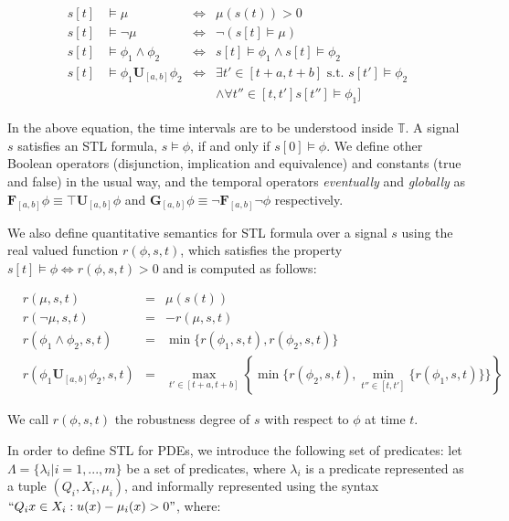 \documentclass{article}
\newcommand{\Always}{\mathbf{G}}
\newcommand{\Event}{\mathbf{F}}
\newcommand{\luntil}{\mathbf{U}}
\begin{document}
\begin{equation}
    \begin{aligned}
        s[t] &\models \mu &\iff &\mu(s(t)) > 0 \\
        s[t] &\models \lnot \mu &\iff &\lnot (s[t] \models \mu) \\
        s[t] &\models \phi_1 \land \phi_2 &\iff &s[t] \models \phi_1 \land s[t]
        \models \phi_2 \\
        s[t] &\models \phi_1 \luntil_{[a,b]} \phi_2 &\iff 
            &\exists t' \in [t+a, t+b] \text{ s.t. } s[t'] \models \phi_2 \\
        & & &\land \forall t'' \in [t, t'] s[t''] \models \phi_1]
    \end{aligned}
\end{equation}

In the above equation, the time intervals are to be understood inside
$\mathbb{T}$. A signal $s$ satisfies an STL formula, $s \models \phi$, if and
only if $s[0] \models \phi$. We define other Boolean operators (disjunction,
implication and equivalence) and constants (true and false) in the usual way, 
and the temporal operators
\emph{eventually} and \emph{globally} as $\Event_{[a, b]} \phi \equiv \top
\luntil_{[a,b]} \phi$ and $\Always_{[a, b]} \phi \equiv \lnot \Event_{[a,b]}
\lnot \phi$ respectively.

We also define quantitative semantics for STL formula over a signal $s$
using the real valued function $r(\phi, s, t)$, which satisfies the property $s[t]
\models \phi \iff r(\phi,s, t) > 0$ and is computed as follows:

\begin{equation}
    \begin{aligned}
        &r(\mu, s, t) &= &\mu(s(t)) \\
        &r(\lnot \mu, s, t) &= &-r(\mu, s,t) \\
        &r(\phi_1 \land \phi_2, s, t) &= &\min\{r(\phi_1,s, t),
    r(\phi_2,s, t)\} \\
    &r(\phi_1 \luntil_{[a,b]} \phi_2,s, t) &= 
    &\max_{t' \in [t+a, t+b]} \left \{ \min\{ r(\phi_2,s, t), 
\min_{t'' \in [t, t']}\{r(\phi_1,s, t)\}\} \right \}
    \end{aligned}
\end{equation}

We call $r(\phi,s, t)$ the robustness degree of $s$ with respect to $\phi$ at
time $t$.

In order to define STL for PDEs, we introduce the following set of predicates:
let $\Lambda = \{\lambda_i | i = 1,...,m\}$ be a set of predicates, where
$\lambda_i$ is a predicate represented as a tuple $(Q_i, X_i, \mu_i)$, and informally represented using the syntax $``Q_i x \in X_i : u(x) - \mu_i(x) >
0"$, where:
\end{document}
